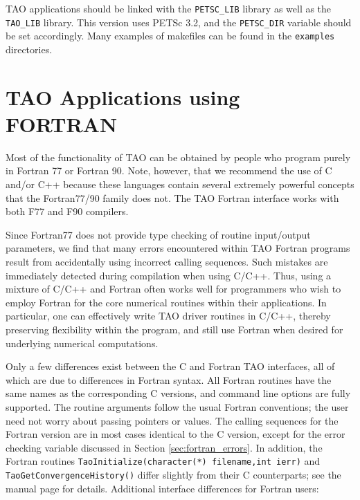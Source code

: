 TAO applications should be linked with the
{\tt PETSC\_LIB} library
as well as the {\tt TAO\_LIB} library. This version uses
PETSc 3.2, and the {\tt PETSC\_DIR} variable
should be set accordingly.  Many examples of makefiles
can be found in the {\tt examples} directories.


\section{TAO Applications using FORTRAN}
\label{chapter:fortran}
Most of the functionality of TAO can be obtained by people who program
purely in Fortran 77 or Fortran 90.  Note, however, that we recommend
the use of C and/or C++ because these languages contain several
extremely powerful concepts that the Fortran77/90 family does not.
The TAO Fortran interface works with both F77 and F90 compilers.

Since Fortran77 does not provide type checking of routine input/output
parameters, we find that many errors encountered within TAO Fortran
programs result from accidentally using incorrect calling sequences.
Such mistakes are immediately detected during compilation when using
C/C++.  Thus, using a mixture of C/C++ and Fortran often works well
for programmers who wish to employ Fortran for the core numerical
routines within their applications.  In particular, one can
effectively write TAO driver routines in C/C++, thereby preserving
flexibility within the program, and still use Fortran when desired for
underlying numerical computations.


Only a few differences exist between the C and Fortran TAO interfaces,
all of which are due to differences in Fortran syntax.  All Fortran
routines have the same names as the corresponding C versions, and
command line options are fully supported. The routine arguments follow
the usual Fortran conventions; the user need not worry about passing
pointers or values.  The calling sequences for the Fortran version are
in most cases identical to the C version, except for the error
checking variable discussed in Section \ref{sec:fortran_errors}.  In
addition, the Fortran routines {\tt TaoInitialize(character(*) filename,int ierr)} and {\tt TaoGetConvergenceHistory()}
differ slightly from their C counterparts; see the manual page for
details.
Additional interface differences for Fortran users:

